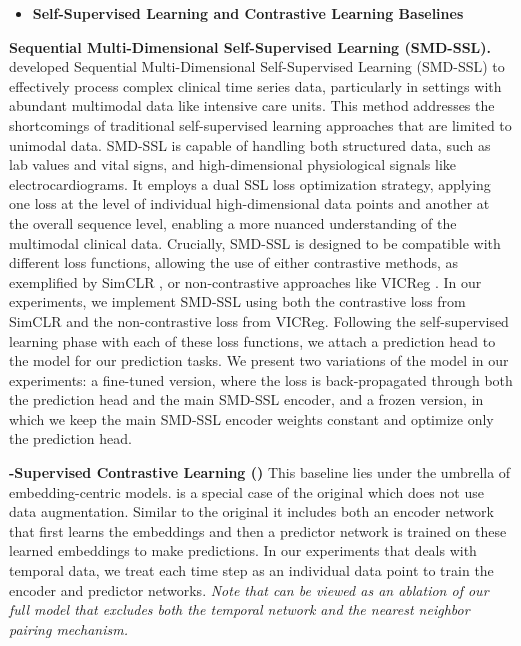 \begin{itemize}
    \item \textbf{Self-Supervised Learning and Contrastive Learning Baselines}
    
\end{itemize}
\noindent
\textbf{Sequential Multi-Dimensional Self-Supervised Learning (SMD-SSL).}
\citet{raghu2023sequential} developed Sequential Multi-Dimensional Self-Supervised Learning (SMD-SSL) to effectively process complex clinical time series data, particularly in settings with abundant multimodal data like intensive care units. This method addresses the shortcomings of traditional self-supervised learning approaches that are limited to unimodal data. SMD-SSL is capable of handling both structured data, such as lab values and vital signs, and high-dimensional physiological signals like electrocardiograms. It employs a dual SSL loss optimization strategy, applying one loss at the level of individual high-dimensional data points and another at the overall sequence level, enabling a more nuanced understanding of the multimodal clinical data. Crucially, SMD-SSL is designed to be compatible with different loss functions, allowing the use of either contrastive methods, as exemplified by SimCLR \citep{chen2020simple}, or non-contrastive approaches like VICReg \citep{bardes2021vicreg}. In our experiments, we implement SMD-SSL using both the contrastive loss from SimCLR and the non-contrastive loss from VICReg. Following the self-supervised learning phase with each of these loss functions, we attach a prediction head to the model for our prediction tasks. We present two variations of the model in our experiments: a fine-tuned version, where the loss is back-propagated through both the prediction head and the main SMD-SSL encoder, and a frozen version, in which we keep the main SMD-SSL encoder weights constant and optimize only the prediction head.


\noindent
\textbf{-Supervised Contrastive Learning ({})}
This baseline lies under the umbrella of embedding-centric models.  is a special case of the original  \citep{khosla2020supervised} which does not use data augmentation.
Similar to the original  it includes both an encoder network that first learns the embeddings and then a predictor network is trained on these learned embeddings to make predictions.
In our experiments that deals with temporal data, we treat each time step as an individual data point to train the encoder and predictor networks. \emph{Note that  can be viewed as an ablation of our full  model that excludes both the temporal network and the nearest neighbor pairing mechanism.}  

